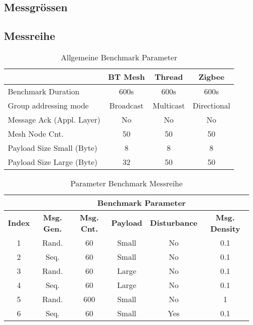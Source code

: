 \subsection{Messgrössen}\label{subsec:MessgrössenMesh}

\subsection{Messreihe}\label{subsec:Messreihe}


\begin{table}[h]
\centering
\begin{tabular}{lccc} 
\toprule
 & BT Mesh & Thread & Zigbee \\ 
\hline
Benchmark Duration & 600s & 600s & 600s \\
Group addressing mode & Broadcast & Multicast & Directional \\
Message Ack (Appl. Layer) & No & No & No \\
Mesh Node Cnt. & 50 & 50 & 50 \\
Payload Size Small (Byte) & 8 & 8 & 8 \\
Payload Size Large (Byte) & 32 & 50 & 50 \\
\bottomrule
\end{tabular}
\caption{Allgemeine Benchmark Parameter}
\label{tab:AllgemeineBenchmarkParameter}
\end{table}

\begin{table}[h]
\centering
\begin{tabular}{|c|c|c|c|c|c|} 
\cline{2-6}
\multicolumn{1}{c|}{} & \multicolumn{5}{c|}{Benchmark Parameter} \\ 
\hline
\textbf{Index}  & \textbf{Msg. Gen.}  & \textbf{Msg. Cnt.}  & \textbf{Payload }  & \textbf{Disturbance}  & \textbf{Msg. Density}  \\ 
\hline
1 & Rand. & 60 & Small & No & 0.1 \\ 
\hline
2 & Seq. & 60 & Small & No & 0.1 \\ 
\hline
3 & Rand. & 60 & Large & No & 0.1 \\ 
\hline
4 & Seq. & 60 & Large & No & 0.1 \\ 
\hline
5 & Rand. & 600 & Small & No & 1 \\ 
\hline
6 & Seq. & 60 & Small & Yes & 0.1 \\
\hline
\end{tabular}
\caption{Parameter Benchmark Messreihe}
\label{tab:ParameterBenchmarkMessreihe}
\end{table}



